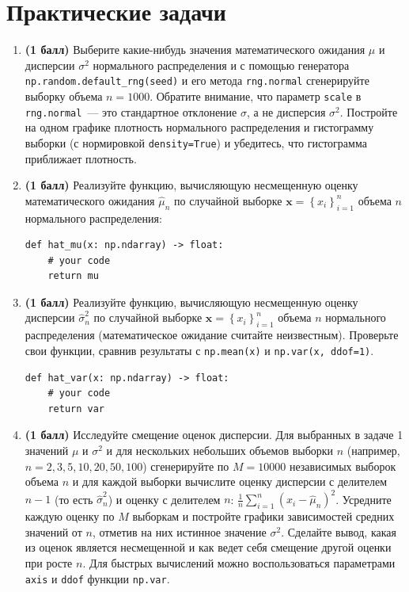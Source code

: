 \documentclass[a4paper,12pt]{article}
\newcommand{\pts}[1]{\textbf{(#1)}}
\begin{document}
\section*{Практические задачи}

\begin{enumerate}
  \item \pts{1 балл} Выберите какие-нибудь значения математического ожидания $\mu$ и дисперсии $\sigma^2$ нормального распределения и с помощью генератора \lstinline|np.random.default_rng(seed)| и его метода \lstinline|rng.normal| сгенерируйте выборку объема $n=1000$. Обратите внимание, что параметр \lstinline|scale| в \lstinline|rng.normal|~--- это стандартное отклонение $\sigma$, а не дисперсия $\sigma^2$. Постройте на одном графике плотность нормального распределения и гистограмму выборки (с нормировкой \lstinline|density=True|) и убедитесь, что гистограмма приближает плотность.

  \item \pts{1 балл} Реализуйте функцию, вычисляющую несмещенную оценку математического ожидания $\hat{\mu}_n$ по случайной выборке 
  $\mathbf{x}=\left\{x_i\right\}_{i=1}^n$ объема $n$ нормального распределения:
\begin{lstlisting}
def hat_mu(x: np.ndarray) -> float:
    # your code
    return mu
\end{lstlisting}

  \item \pts{1 балл} Реализуйте функцию, вычисляющую несмещенную оценку дисперсии $\hat{\sigma}_n^2$ по случайной выборке 
  $\mathbf{x}=\left\{x_i\right\}_{i=1}^n$ объема $n$ нормального распределения (математическое ожидание считайте неизвестным). Проверьте свои функции, сравнив результаты с \lstinline|np.mean(x)| и \lstinline|np.var(x, ddof=1)|.
\begin{lstlisting}
def hat_var(x: np.ndarray) -> float:
    # your code
    return var
\end{lstlisting}

  \item \pts{1 балл} Исследуйте смещение оценок дисперсии. Для выбранных в задаче 1 значений $\mu$ и $\sigma^2$ и для нескольких небольших объемов выборки $n$ (например, $n=2,3,5,10,20,50,100$) сгенерируйте по $M=10000$ независимых выборок объема $n$ и для каждой выборки вычислите оценку дисперсии с делителем $n-1$ (то есть $\hat{\sigma}_n^2$) и оценку с делителем $n$: $\frac1n\sum_{i=1}^n\left(x_i-\hat{\mu}_n\right)^2$. Усредните каждую оценку по $M$ выборкам и постройте графики зависимостей средних значений от $n$, отметив на них истинное значение $\sigma^2$. Сделайте вывод, какая из оценок является несмещенной и как ведет себя смещение другой оценки при росте $n$. Для быстрых вычислений можно воспользоваться параметрами \lstinline|axis| и \lstinline|ddof| функции \lstinline|np.var|.


\end{enumerate}
\end{document}
